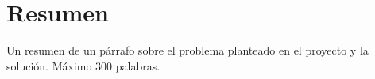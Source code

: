 \chapter*{Resumen}
Un resumen de un párrafo sobre el problema planteado en el proyecto y la solución. Máximo 300 palabras.